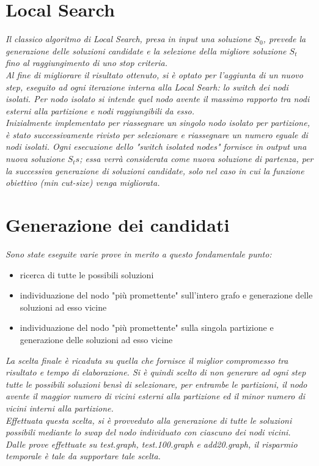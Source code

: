 \documentclass[12pt,titlepage,oneside]{article}
\begin{document}
\section{Local Search}
\textit{Il classico algoritmo di Local Search, presa in input una soluzione $S_0$, prevede la generazione delle soluzioni candidate e la selezione della migliore soluzione $S_t$ fino al raggiungimento di uno stop criteria.\\
Al fine di migliorare il risultato ottenuto, si è optato per l'aggiunta di un nuovo step, eseguito ad ogni iterazione interna alla Local Searh: lo switch dei nodi isolati. Per nodo isolato si intende quel nodo avente il massimo rapporto tra nodi esterni alla partizione e nodi raggiungibili da esso.\\
Inizialmente implementato per riassegnare un singolo nodo isolato per partizione, è stato successivamente rivisto per selezionare e riassegnare un numero eguale di nodi isolati. Ogni esecuzione dello "switch isolated nodes" fornisce in output una nuova soluzione $S_ts$; essa verrà considerata come nuova soluzione di partenza, per la successiva generazione di soluzioni candidate, solo nel caso in cui la funzione obiettivo (min cut-size) venga migliorata.}

\clearpage
\section{Generazione dei candidati}
\textit{Sono state eseguite varie prove in merito a questo fondamentale punto:}
\begin{itemize}
  \item ricerca di tutte le possibili soluzioni
  \item individuazione del nodo "più promettente" sull'intero grafo e generazione delle soluzioni ad esso vicine
  \item individuazione del nodo "più promettente" sulla singola partizione e generazione delle soluzioni ad esso vicine
\end{itemize}
\textit{La scelta finale è ricaduta su quella che fornisce il miglior compromesso tra risultato e tempo di elaborazione. Si è quindi scelto di non generare ad ogni step tutte le possibili soluzioni bensì di selezionare, per entrambe le partizioni, il nodo avente il maggior numero di vicini esterni alla partizione ed il minor numero di vicini interni alla partizione.\\
Effettuata questa scelta, si è provveduto alla generazione di tutte le soluzioni possibili mediante lo swap del nodo individuato con ciascuno dei nodi vicini.\\
Dalle prove effettuate su test.graph, test.100.graph e add20.graph, il risparmio temporale è tale da supportare tale scelta.}
\end{document}
